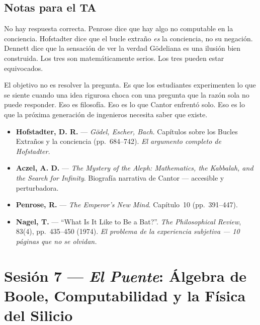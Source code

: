 \documentclass[11pt, letterpaper]{article}
\begin{document}
\subsection*{Notas para el TA}

No hay respuesta correcta. Penrose dice que hay algo no computable en la conciencia. Hofstadter dice que el bucle extra\~no \emph{es} la conciencia, no su negaci\'on. Dennett dice que la sensaci\'on de ver la verdad G\"odeliana es una ilusi\'on bien construida. Los tres son matem\'aticamente serios. Los tres pueden estar equivocados.

El objetivo no es resolver la pregunta. Es que los estudiantes experimenten lo que se siente cuando una idea rigurosa choca con una pregunta que la raz\'on sola no puede responder. Eso es filosof\'ia. Eso es lo que Cantor enfrent\'o solo. Eso es lo que la pr\'oxima generaci\'on de ingenieros necesita saber que existe.

\begin{lecturas}
\begin{itemize}
  \item[$(\star)$] \textbf{Hofstadter, D. R.} --- \emph{G\"odel, Escher, Bach}. Cap\'itulos sobre los Bucles Extra\~nos y la conciencia (pp.\ 684--742). \textit{El argumento completo de Hofstadter.}
  \item[$(\star)$] \textbf{Aczel, A. D.} --- \emph{The Mystery of the Aleph: Mathematics, the Kabbalah, and the Search for Infinity}. Biograf\'ia narrativa de Cantor --- accesible y perturbadora.
  \item \textbf{Penrose, R.} --- \emph{The Emperor's New Mind}. Cap\'itulo~10 (pp.\ 391--447).
  \item \textbf{Nagel, T.} --- ``What Is It Like to Be a Bat?''. \textit{The Philosophical Review}, 83(4), pp.\ 435--450 (1974). \textit{El problema de la experiencia subjetiva --- 10 p\'aginas que no se olvidan.}
\end{itemize}
\end{lecturas}

\newpage

\section{Sesi\'on 7 --- \textit{El Puente}: \'Algebra de Boole, Computabilidad y la F\'isica del Silicio}
\end{document}

